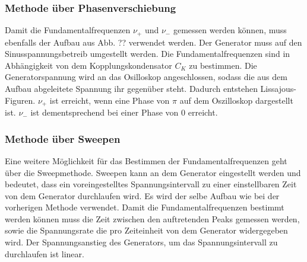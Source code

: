 \subsubsection{Methode über Phasenverschiebung}

Damit die Fundamentalfrequenzen $\nu_+$ und $\nu_-$ gemessen werden können, muss
ebenfalls der Aufbau aus Abb. ?? verwendet werden. Der Generator muss auf den
Sinusspannungsbetreib umgestellt werden. Die Fundamentalfrequenzen sind in Abhängigkeit
von dem Kopplungskondensator $C_K$ zu bestimmen. Die Generatorspannung wird an das
Osilloskop angeschlossen, sodass die aus dem Aufbau abgeleitete Spannung ihr
gegenüber steht. Dadurch entstehen Lissajous-Figuren. $\nu_+$ ist erreicht, wenn
eine Phase von $\pi$ auf dem Oszilloskop dargestellt ist. $\nu_-$ ist dementsprechend
bei einer Phase von $0$ erreicht.

\subsubsection{Methode über Sweepen}

Eine weitere Möglichkeit für das Bestimmen der Fundamentalfrequenzen geht über die
Sweepmethode.
Sweepen kann an dem Generator eingestellt werden und bedeutet, dass ein voreingestelltes
Spannungsintervall zu einer einstellbaren Zeit von dem Generator durchlaufen wird.
Es wird der selbe Aufbau wie bei der vorherigen Methode verwendet.
Damit die Fundamentalfrequenzen bestimmt werden können muss die Zeit zwischen den
auftretenden Peaks gemessen werden, sowie die Spannungsrate die pro Zeiteinheit
von dem Generator widergegeben wird. Der Spannungsanstieg des Generators, um das
Spannungsintervall zu durchlaufen ist linear.

\printbibliography


